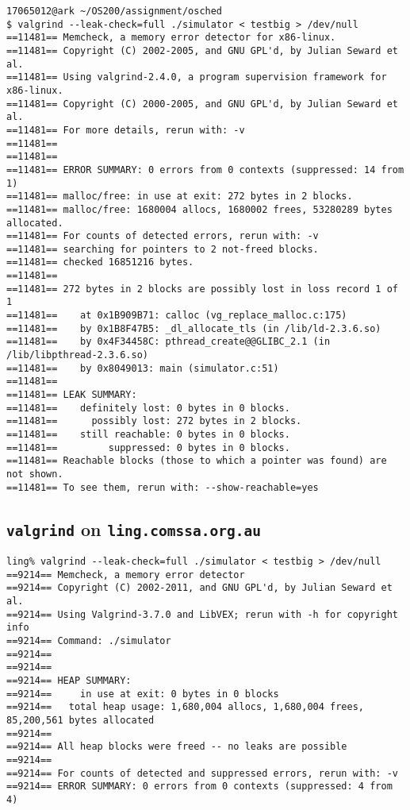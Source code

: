 \documentclass[a4paper,12pt,titlepage]{article}
\begin{document}
\begin{lstlisting}
17065012@ark ~/OS200/assignment/osched
$ valgrind --leak-check=full ./simulator < testbig > /dev/null
==11481== Memcheck, a memory error detector for x86-linux.
==11481== Copyright (C) 2002-2005, and GNU GPL'd, by Julian Seward et al.
==11481== Using valgrind-2.4.0, a program supervision framework for x86-linux.
==11481== Copyright (C) 2000-2005, and GNU GPL'd, by Julian Seward et al.
==11481== For more details, rerun with: -v
==11481==
==11481==
==11481== ERROR SUMMARY: 0 errors from 0 contexts (suppressed: 14 from 1)
==11481== malloc/free: in use at exit: 272 bytes in 2 blocks.
==11481== malloc/free: 1680004 allocs, 1680002 frees, 53280289 bytes allocated.
==11481== For counts of detected errors, rerun with: -v
==11481== searching for pointers to 2 not-freed blocks.
==11481== checked 16851216 bytes.
==11481==
==11481== 272 bytes in 2 blocks are possibly lost in loss record 1 of 1
==11481==    at 0x1B909B71: calloc (vg_replace_malloc.c:175)
==11481==    by 0x1B8F47B5: _dl_allocate_tls (in /lib/ld-2.3.6.so)
==11481==    by 0x4F34458C: pthread_create@@GLIBC_2.1 (in /lib/libpthread-2.3.6.so)
==11481==    by 0x8049013: main (simulator.c:51)
==11481==
==11481== LEAK SUMMARY:
==11481==    definitely lost: 0 bytes in 0 blocks.
==11481==      possibly lost: 272 bytes in 2 blocks.
==11481==    still reachable: 0 bytes in 0 blocks.
==11481==         suppressed: 0 bytes in 0 blocks.
==11481== Reachable blocks (those to which a pointer was found) are not shown.
==11481== To see them, rerun with: --show-reachable=yes
\end{lstlisting}

\subsection{\texttt{valgrind} on \texttt{ling.comssa.org.au}}

\begin{lstlisting}
ling% valgrind --leak-check=full ./simulator < testbig > /dev/null
==9214== Memcheck, a memory error detector
==9214== Copyright (C) 2002-2011, and GNU GPL'd, by Julian Seward et al.
==9214== Using Valgrind-3.7.0 and LibVEX; rerun with -h for copyright info
==9214== Command: ./simulator
==9214==
==9214==
==9214== HEAP SUMMARY:
==9214==     in use at exit: 0 bytes in 0 blocks
==9214==   total heap usage: 1,680,004 allocs, 1,680,004 frees, 85,200,561 bytes allocated
==9214==
==9214== All heap blocks were freed -- no leaks are possible
==9214==
==9214== For counts of detected and suppressed errors, rerun with: -v
==9214== ERROR SUMMARY: 0 errors from 0 contexts (suppressed: 4 from 4)
\end{lstlisting}
\end{document}
